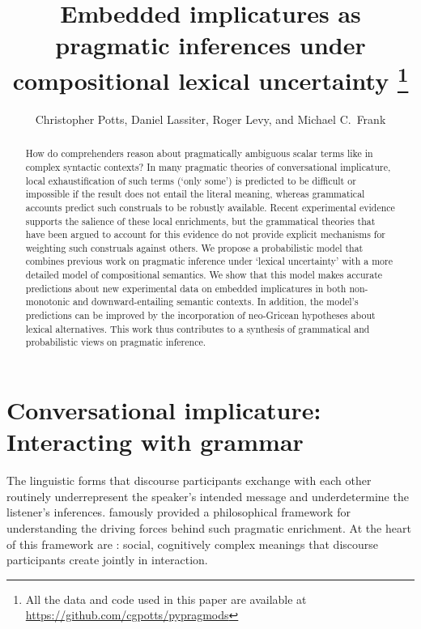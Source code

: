 \documentclass[leqno,12pt]{article}
\begin{document}
\renewcommand{\marginnote}[1]{} 
\renewcommand{\todo}[1]{}
\renewcommand{\Rogersmarginnote}[1]{}


\title{Embedded implicatures as pragmatic inferences under compositional lexical uncertainty%
  \thanks{All the data and code used in this paper are available at \url{https://github.com/cgpotts/pypragmods}}}
\author{Christopher Potts, Daniel Lassiter, Roger Levy, and Michael C.~Frank}
\maketitle

\begin{abstract} 
  How do comprehenders reason about pragmatically ambiguous scalar
  terms like  in complex syntactic contexts?  In many
  pragmatic theories of conversational implicature, local
  exhaustification of such terms (`only some') is predicted to be
  difficult or impossible if the result does not entail the literal
  meaning, whereas grammatical accounts predict such construals to be
  robustly available. Recent experimental evidence supports the
  salience of these local enrichments, but the grammatical theories
  that have been argued to account for this evidence do not provide
  explicit mechanisms for weighting such construals against others. We
  propose a probabilistic model that combines previous work on
  pragmatic inference under `lexical uncertainty' with a more detailed
  model of compositional semantics. We show that this model makes
  accurate predictions about new experimental data on embedded
  implicatures in both non-monotonic and downward-entailing semantic
  contexts. In addition, the model's predictions can be improved by
  the incorporation of neo-Gricean hypotheses about lexical
  alternatives. This work thus contributes to a synthesis of
  grammatical and probabilistic views on pragmatic inference.
\end{abstract}


\section{Conversational implicature: Interacting with grammar}\label{sec:introduction}

The linguistic forms that discourse participants exchange with each
other routinely underrepresent the speaker's intended message and
underdetermine the listener's inferences. \citet{Grice75} famously
provided a philosophical framework for understanding the driving
forces behind such pragmatic enrichment. At the heart of this
framework are : social, cognitively
complex meanings that discourse participants create jointly in
interaction.
\end{document}
